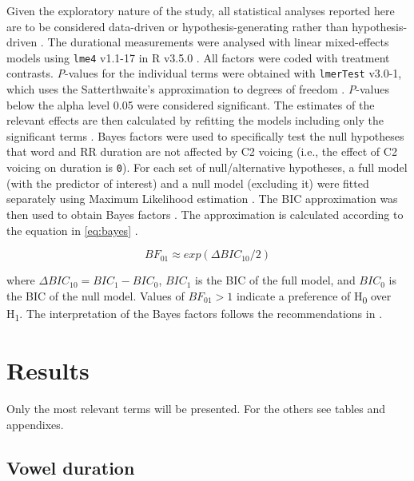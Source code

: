 \documentclass[preprint]{JASAnew}
\begin{document}
Given the exploratory nature of the study, all statistical analyses
reported here are to be considered data-driven or hypothesis-generating
rather than hypothesis-driven \citep{kerr1998}. The durational
measurements were analysed with linear mixed-effects models using
\texttt{lme4} v1.1-17 in R v3.5.0 \citep{r-core-team2018, bates2015}.
All factors were coded with treatment contrasts. \emph{P}-values for the
individual terms were obtained with \texttt{lmerTest} v3.0-1, which uses
the Satterthwaite's approximation to degrees of freedom
\citep{kuznetsova2017}. \emph{P}-values below the alpha level 0.05 were
considered significant. The estimates of the relevant effects are then
calculated by refitting the models including only the significant terms
\citep[step-down approach,][pp.~121--122]{diggle2002, zuur2009}. Bayes
factors were used to specifically test the null hypotheses that word and
RR duration are not affected by C2 voicing (i.e., the effect of C2
voicing on duration is \texttt{0}). For each set of null/alternative
hypotheses, a full model (with the predictor of interest) and a null
model (excluding it) were fitted separately using Maximum Likelihood
estimation \citep[p.~34]{bates2015}. The BIC approximation was then used
to obtain Bayes factors
\citep{raftery1995, raftery1999, wagenmakers2007, jarosz2014}. The
approximation is calculated according to the equation in \ref{eq:bayes}
\citep[p.~796]{wagenmakers2007}.

\begin{equation}
\label{eq:bayes}
BF_{01} \approx exp(\Delta{}BIC_{10}/2)
\end{equation}

where \(\Delta{}BIC_{10} = BIC_1 - BIC_0\), \(BIC_1\) is the BIC of the
full model, and \(BIC_0\) is the BIC of the null model. Values of
\(BF_{01} > 1\) indicate a preference of H\textsubscript{0} over
H\textsubscript{1}. The interpretation of the Bayes factors follows the
recommendations in \citet[p.~139]{raftery1995}.

\hypertarget{results}{%
\section{Results}\label{results}}

Only the most relevant terms will be presented. For the others see
tables and appendixes.

\hypertarget{vowel-duration}{%
\subsection{Vowel duration}\label{vowel-duration}}
\end{document}
